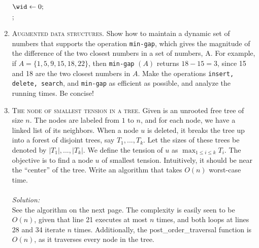 \documentclass[12pt]{article}
\theoremstyle{definition}
\theoremstyle{remark}
\newcommand\sol{%
  \\ 
  \\
  \textit{Solution:}\\%
}
\begin{document}
\begin{enumerate}
\begin{algorithm}
    $\wid \gets 0;$\\ 
    \Return \wid;
    
  \end{algorithm}
 \newpage 
  \item \textsc{Augmented data structures.} Show how to maintain a dynamic set of numbers that
supports the operation \texttt{min-gap}, which gives the magnitude of the difference of the two closest numbers in a set of numbers, A. For example, if $A = \{1, 5, 9, 15, 18, 22\}$, then \texttt{min-gap} $(A)$ returns $18 - 15 = 3$, since 15 and 18 are the two closest numbers in $A$. Make the operations \texttt{insert, delete, search}, and \texttt{min-gap} as efficient as possible, and analyze the running times. Be concise! 
\newpage 
\item \textsc{The node of smallest tension in a tree.} Given is an unrooted free tree of size $n$.
The nodes are labeled from $1$ to $n$, and for each node, we have a linked list of its neighbors. When a node $u$ is deleted, it breaks the tree up into a forest of disjoint trees, say $T_1, ... , T_k$. Let the sizes of these trees be denoted by $|T_1|,... , |T_k|$. We define the tension of $u$ as $\max_{1 \leq i \leq k} T_i$. The objective is to find a node $u$ of smallest tension. Intuitively, it should be near the “center” of the tree. Write an algorithm
that takes $O(n)$ worst-case time.
\sol 
See the algorithm on the next page. The complexity is easily seen to be $O(n)$, given that line 21 executes at most $n$ times, and both loops at lines 28 and 34 iterate $n$ times. Additionally, the post\_order\_traversal function is $O(n)$, as it traverses every node in the tree. 


\end{enumerate}
\end{document}
